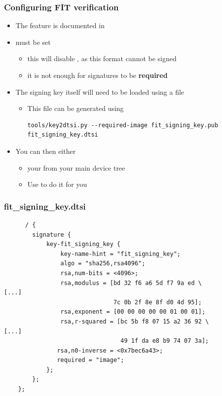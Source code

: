 \begin{frame}[fragile]
  \frametitle{Configuring FIT verification}
  \begin{itemize}
    \item The feature is documented in 
    \item {} must be set
    \begin{itemize}
      \item this will disable , as this format cannot be signed
      \item it is not enough for signatures to be \textbf{required}
    \end{itemize}
    \item The signing key itself will need to be loaded using a  file
    \begin{itemize}
      \item This file can be generated using 
          \begin{verbatim}
tools/key2dtsi.py --required-image fit_signing_key.pub fit_signing_key.dtsi
            \end{verbatim}
    \end{itemize}
    \item You can then either
    \begin{itemize}
      \item {} your  from your main device tree
      \item Use  to do it for you
    \end{itemize}
  \end{itemize}
\end{frame}

\begin{frame}[fragile]
  \frametitle{fit\_signing\_key.dtsi}
  \begin{verbatim}
      / {
        signature {
            key-fit_signing_key {
                key-name-hint = "fit_signing_key";
                algo = "sha256,rsa4096";
                rsa,num-bits = <4096>;
                rsa,modulus = [bd 32 f6 a6 5d f7 9a ed \
[...]
                               7c 0b 2f 8e 8f d0 4d 95];
                rsa,exponent = [00 00 00 00 00 01 00 01];
                rsa,r-squared = [bc 5b f8 07 15 a2 36 92 \
[...]
                                 49 1f da e8 b9 74 07 3a];
               rsa,n0-inverse = <0x7bec6a43>;
               required = "image";
            };
        };
    };
  \end{verbatim}
\end{frame}

